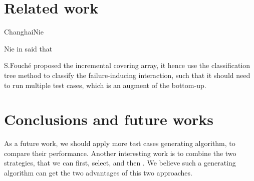 \documentclass[conference]{IEEEtran}
\theoremstyle{definition}
\begin{document}
\section{Related work}
ChanghaiNie \cite{nie2011survey} 

Nie in \cite{nie2013adaptive} said that

S.Fouch{\'e} \cite{fouche2009incremental} proposed the incremental covering array, it hence use the classification tree method to classify the failure-inducing interaction, such that it should need to run multiple test cases, which is an augment of the bottom-up.


\section{Conclusions and future works}


As a future work, we should apply more test cases generating algorithm, to compare their performance. Another interesting work is to combine the two strategies, that we can first, select, and then . We believe such a generating algorithm can get the two advantages of this two approaches.

%
%

\end{document}
